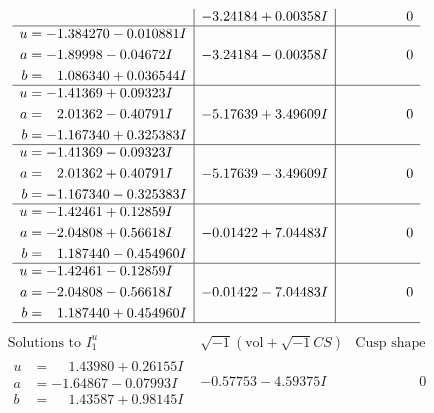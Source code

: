 \documentclass[1p]{elsarticle_modified}
\theoremstyle{definition}
\newcommand{\I}{\sqrt{-1}}
\begin{document}
$$\begin{array}{c|c|c}
 & -3.24184 + 0.00358 I & \phantom{-0.000000 } 0 \\ \hline\begin{aligned}
u &= -1.384270 - 0.010881 I \\
a &= -1.89998 - 0.04672 I \\
b &= \phantom{-}1.086340 + 0.036544 I\end{aligned}
 & -3.24184 - 0.00358 I & \phantom{-0.000000 } 0 \\ \hline\begin{aligned}
u &= -1.41369 + 0.09323 I \\
a &= \phantom{-}2.01362 - 0.40791 I \\
b &= -1.167340 + 0.325383 I\end{aligned}
 & -5.17639 + 3.49609 I & \phantom{-0.000000 } 0 \\ \hline\begin{aligned}
u &= -1.41369 - 0.09323 I \\
a &= \phantom{-}2.01362 + 0.40791 I \\
b &= -1.167340 - 0.325383 I\end{aligned}
 & -5.17639 - 3.49609 I & \phantom{-0.000000 } 0 \\ \hline\begin{aligned}
u &= -1.42461 + 0.12859 I \\
a &= -2.04808 + 0.56618 I \\
b &= \phantom{-}1.187440 - 0.454960 I\end{aligned}
 & -0.01422 + 7.04483 I & \phantom{-0.000000 } 0 \\ \hline\begin{aligned}
u &= -1.42461 - 0.12859 I \\
a &= -2.04808 - 0.56618 I \\
b &= \phantom{-}1.187440 + 0.454960 I\end{aligned}
 & -0.01422 - 7.04483 I & \phantom{-0.000000 } 0\\
 \hline 
 \end{array}$$\newpage$$\begin{array}{c|c|c}  
\text{Solutions to }I^u_{1}& \I (\text{vol} + \sqrt{-1}CS) & \text{Cusp shape}\\
 \hline 
\begin{aligned}
u &= \phantom{-}1.43980 + 0.26155 I \\
a &= -1.64867 - 0.07993 I \\
b &= \phantom{-}1.43587 + 0.98145 I\end{aligned}
 & -0.57753 - 4.59375 I & \phantom{-0.000000 } 0 \\ \hline\begin{aligned}

\end{aligned}
\end{array}$$
\end{document}
